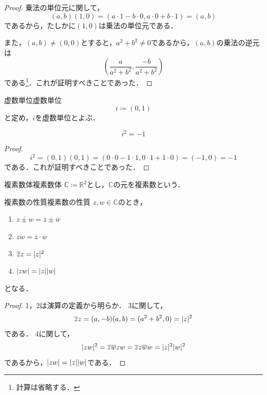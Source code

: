 \begin{tleftbar}
\begin{proof}
  乗法の単位元に関して，
  \[
    (a,b)(1,0) = (a \cdot 1 - b \cdot 0 , a \cdot 0 + b \cdot 1) = (a,b)
  \]
  であるから，たしかに$(1,0)$は乗法の単位元である．

  また，$(a,b) \ne (0,0)$とすると，$a^2+b^2 \ne 0$であるから，$(a,b)$の乗法の逆元は
  \[
    \left( \frac{a}{a^2+b^2},\frac{-b}{a^2+b^2} \right)
  \]
  である\footnote{計算は省略する．}．これが証明すべきことであった．
\end{proof}
\end{tleftbar}

\begin{definition}{虚数単位}{虚数単位}
  \[
    i \coloneqq (0,1)
  \]
  と定め，$i$を虚数単位とよぶ．
\end{definition}

\begin{prop}{}{}
\[
  i^2 =-1
\]
\end{prop}

\begin{tleftbar}
  \begin{proof}
    \[
      i^2 = (0,1)(0,1) = (0 \cdot 0 - 1 \cdot 1 , 0 \cdot 1 + 1 \cdot 0) = (-1,0) = -1
    \]
    である．これが証明すべきことであった．
  \end{proof}
\end{tleftbar}

\begin{definition}{複素数体}{複素数体}
  $\mathbb{C} \coloneqq \mathbb{R}^2$とし，$\mathbb{C}$の元を複素数という．
\end{definition}

\begin{prop}{複素数の性質}{複素数の性質}
  $z,w \in \mathbb{C}$のとき，
  \begin{enumerate}
    \item $\overline{z \pm w} = \overline{z} \pm \overline{w}$
    \item $\overline{zw} = \overline{z} \cdot \overline{w}$
    \item $\overline{z}z = \lvert z\rvert^2$
    \item $\lvert zw\rvert = \lvert z\rvert \lvert w\rvert$
  \end{enumerate}
  となる．
\end{prop}

\begin{tleftbar}
  \begin{proof}
    1，2は演算の定義から明らか．
    3に関して，
    \[
      \overline{z}z = (a,-b)(a,b) = (a^2+b^2,0) = \lvert z\rvert^2
    \]
    である．
    4に関して，
    \[
      \lvert zw\rvert^2 = \overline{zw}zw = \overline{z}z \overline{w}w = \lvert z\rvert^2 \lvert w\rvert^2
    \]
    であるから，$\lvert zw\rvert = \lvert z\rvert \lvert w\rvert$である．
  \end{proof}
\end{tleftbar}

